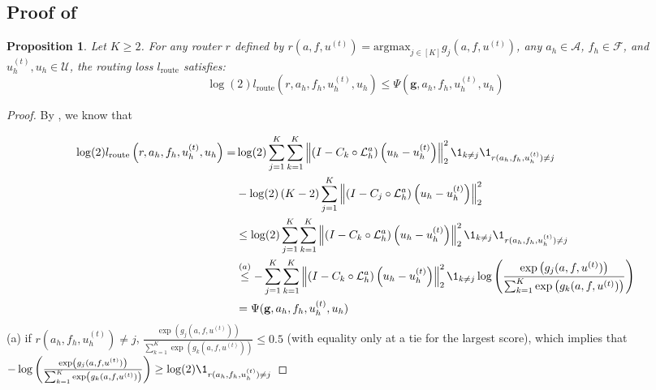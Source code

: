 \documentclass{article}
\newcommand{\edit}[1]{{\color{red}#1}}
\newtheorem{proposition}[theorem]{Proposition}
\begin{document}
\subsection{Proof of } \label{sec:proofupperbound}

\begin{proposition} \label{th:upperbound}
    \edit{Let $K \ge 2$.} For any router $r$ defined by $r(a, f, u^{(t)}) = \text{argmax}_{j \in [K]} g_j(a, f, u^{(t)})$, any $a_h \in \mathcal{A}$, $f_h \in \mathcal{F}$, and $u_h^{(t)}, u_h \in \mathcal{U}$, the routing loss $l_{\text{route}}$ satisfies:
    \begin{equation*}
        \log(2)l_{\text{route}}\left(r, a_h, f_h, u^{(t)}_h, u_h\right)\leq \Psi(\mathbf{g}, a_h, f_h, u_h^{(t)}, u_h) 
    \end{equation*}
\end{proposition}


\begin{proof}

By , we know that

\begin{align*}
    \log(2)l_{\text{route}}\left(r, a_h, f_h, u^{(t)}_h, u_h\right) = &\log(2)\sum_{j = 1}^K \sum_{k = 1}^K\left\|\left( I - C_{k} \circ \mathcal{L}_{h}^a\right)\left(u_h - u^{(t)}_h\right)\right\|^2_2\1_{k\neq j}\1_{r(a_h, f_h, u^{(t)}_h) \neq j} \\
     &-\log(2)\left(K - 2\right)\sum_{j = 1}^K\left\|\left( I - C_{j} \circ \mathcal{L}_{h}^a\right)\left(u_h - u^{(t)}_h\right)\right\|^2_2 \\
     &\leq \log(2)\sum_{j = 1}^K \sum_{k = 1}^K\left\|\left( I - C_{k} \circ \mathcal{L}_{h}^a\right)\left(u_h - u^{(t)}_h\right)\right\|^2_2\1_{k\neq j}\1_{r(a_h, f_h, u^{(t)}_h) \neq j} \\
     &\overset{(a)}{\leq} -\sum_{j = 1}^K \sum_{k = 1}^K\left\|\left( I - C_{k} \circ \mathcal{L}_{h}^a\right)\left(u_h - u^{(t)}_h\right)\right\|^2_2\1_{k\neq j}\log\left(\frac{\exp\left(g_j(a, f, u^{(t)})\right)}{\sum_{k = 1}^K\exp\left(g_k(a, f, u^{(t)})\right)}\right) \\
     &= \Psi(\mathbf{g}, a_h, f_h, u_h^{(t)}, u_h)
\end{align*}
(a) if $r(a_h, f_h, u^{(t)}_h) \neq j$, $\frac{\exp\left(g_j(a, f, u^{(t)})\right)}{\sum_{k = 1}^K\exp\left(g_k(a, f, u^{(t)})\right)} \le 0.5$ \edit{(with equality only at a tie for the largest score)}, which implies that $-\log\left(\frac{\exp\left(g_j(a, f, u^{(t)})\right)}{\sum_{k = 1}^K\exp\left(g_k(a, f, u^{(t)})\right)}\right)  \geq \log(2)\1_{r(a_h, f_h, u^{(t)}_h) \neq j}$

\end{proof}
\end{document}
